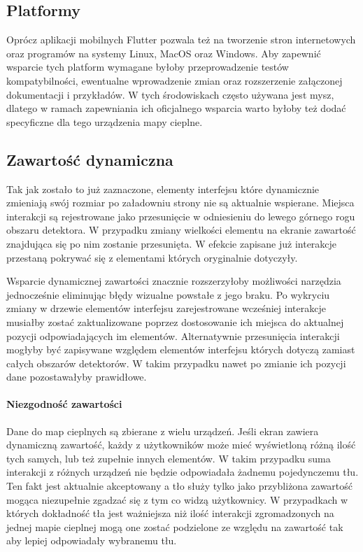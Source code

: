 \subsection{Platformy}
Oprócz aplikacji mobilnych Flutter pozwala też na tworzenie stron internetowych oraz programów na systemy Linux, MacOS oraz Windows. Aby zapewnić wsparcie tych platform wymagane byłoby przeprowadzenie testów kompatybilności, ewentualne wprowadzenie zmian oraz rozszerzenie załączonej dokumentacji i przykładów. W tych środowiskach często używana jest mysz, dlatego w ramach zapewniania ich oficjalnego wsparcia warto byłoby też dodać specyficzne dla tego urządzenia mapy cieplne.

\subsection{Zawartość dynamiczna}
Tak jak zostało to już zaznaczone, elementy interfejsu które dynamicznie zmieniają swój rozmiar po załadowniu strony nie są aktualnie wspierane. Miejsca interakcji są rejestrowane jako przesunięcie w odniesieniu do lewego górnego rogu obszaru detektora. W przypadku zmiany wielkości elementu na ekranie zawartość znajdująca się po nim zostanie przesunięta. W efekcie zapisane już interakcje przestaną pokrywać się z elementami których oryginalnie dotyczyły. 

Wsparcie dynamicznej zawartości znacznie rozszerzyłoby możliwości narzędzia jednocześnie eliminując błędy wizualne powstałe z jego braku. Po wykryciu zmiany w drzewie elementów interfejsu zarejestrowane wcześniej interakcje musiałby zostać zaktualizowane poprzez dostosowanie ich miejsca do aktualnej pozycji odpowiadających im elementów. Alternatywnie przesunięcia interakcji mogłyby być zapisywane względem elementów interfejsu których dotyczą zamiast całych obszarów detektorów. W takim przypadku nawet po zmianie ich pozycji dane pozostawałyby prawidłowe.

\paragraph{Niezgodność zawartości}
Dane do map cieplnych są zbierane z wielu urządzeń. Jeśli ekran zawiera dynamiczną zawartość, każdy z użytkowników może mieć wyświetloną różną ilość tych samych, lub też zupełnie innych elementów. W takim przypadku suma interakcji z różnych urządzeń nie będzie odpowiadała żadnemu pojedynczemu tłu. Ten fakt jest aktualnie akceptowany a tło służy tylko jako przybliżona zawartość mogąca niezupełnie zgadzać się z tym co widzą użytkownicy. W przypadkach w których dokładność tła jest ważniejsza niż ilość interakcji zgromadzonych na jednej mapie cieplnej mogą one zostać podzielone ze względu na zawartość tak aby lepiej odpowiadały wybranemu tłu.

